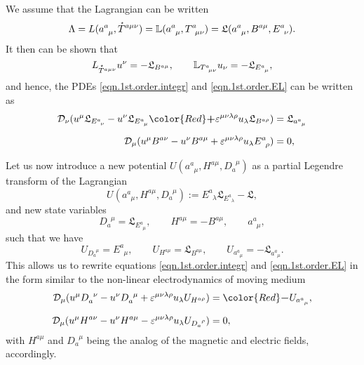 \documentclass[
10pt, %
a4paper, %
oneside, %
headinclude,footinclude, %
BCOR5mm, %
]{scrartcl}
\newcommand{\tetr}[2]{a^{#1}_{\phantom{#1}#2}}
\newcommand{\D}[1]{\mathcal{D}_{#1}} %
\newcommand{\Tors}[2]{T^{#1}_{\phantom{a}#2}}
\newcommand{\ET}[2]{E^{#1}_{\phantom{#1}#2}}	%
\newcommand{\eT}[2]{D_{#1}^{\phantom{#1}#2}}	%
\newcommand{\BT}[2]{B^{#1#2}}	%
\newcommand{\hT}[2]{H^{#1#2}}	%
\newcommand{\Laghodge}{L}%
\newcommand{\Lagtors}{\mathbb{L}}%
\newcommand{\LagBE}{\mathfrak{L}}%
\newcommand{\veps}{\varepsilon}
\newcommand{\HT}[1]{\accentset{\star}{T}^{#1}}
\begin{document}
We assume that the Lagrangian can be written 
\begin{equation}
\Lambda = \Laghodge(\tetr{a}{\mu},\HT{a\mu\nu}) = \Lagtors(\tetr{a}{\mu},\Tors{a}{\mu\nu}) = 
\LagBE(\tetr{a}{\mu},\BT{a}{\mu},\ET{a}{\nu}).
\end{equation}
It then can be shown that 
\begin{equation}
\Laghodge_{\HT{a\mu\nu}}u^\nu = -\LagBE_{\BT{a}{\mu}}, \qquad \Lagtors_{\Tors{a}{\mu\nu}}u_\nu = 
-\LagBE_{\ET{a}{\mu}},
\end{equation}
and hence, the PDEs \eqref{eqn.1st.order.integr} and \eqref{eqn.1st.order.EL} can be written as 
\begin{subequations}\label{eqn.tors.BE}
	\begin{align}
		\D{\nu}(u^\mu \LagBE_{\ET{a}{\nu}} - u^\nu\LagBE_{\ET{a}{\mu}} {\color{Red}\bm{+}} 
		\veps^{\mu\nu\lambda\rho}u_\lambda\LagBE_{\BT{a}{\rho}}) &=\LagBE_{\tetr{a}{\mu}}\\[2mm]
		\D{\mu}(u^\mu \BT{a}{\nu} - u^\nu\BT{a}{\mu} + 
		\veps^{\mu\nu\lambda\rho}u_\lambda\ET{a}{\rho}) &= 0,
	\end{align}
\end{subequations}

Let us now introduce a new potential $ U(\tetr{a}{\mu},\hT{a}{\mu},\eT{a}{\mu}) $ as a partial 
Legendre transform of the Lagrangian
\begin{equation}
 U(\tetr{a}{\mu},\hT{a}{\mu},\eT{a}{\mu}) := \ET{a}{\lambda}\LagBE_{\ET{a}{\lambda}} - \LagBE,
\end{equation}
and new state variables
\begin{equation}
\eT{a}{\mu} = \LagBE_{\ET{a}{\mu}}, \qquad \hT{a}{\mu} = -\BT{a}{\mu}, \qquad \tetr{a}{\mu},
\end{equation}
such that we have
\begin{equation}
U_{\eT{a}{\mu}} = \ET{a}{\mu}, \qquad U_{\hT{a}{\mu}} = \LagBE_{\BT{a}{\mu}},
\qquad U_{\tetr{a}{\mu}} = - \LagBE_{\tetr{a}{\mu}}.
\end{equation}
This allows us to rewrite equations \eqref{eqn.1st.order.integr} and \eqref{eqn.1st.order.EL} in 
the form similar to the non-linear 
electrodynamics of moving medium~\cite{Obukhov2008,DPRZ2017,Hohmann2018a}
\begin{subequations}
	\begin{align}
		\D{\mu}(u^\mu\eT{a}{\nu} - u^\nu\eT{a}{\mu} + \veps^{\mu\nu\lambda\rho}u_\lambda 
		U_{\hT{a}{\rho}})
		& ={\color{Red}\bm{-}}U_{\tetr{a}{\mu}},\\[2mm]
		\D{\mu}(u^\mu \hT{a}{\nu} - u^\nu\hT{a}{\mu} - 
		\veps^{\mu\nu\lambda\rho}u_\lambda 
		U_{\eT{a}{\rho}}) 
		& = 0,
\end{align}
\end{subequations}
with $\hT{a}{\mu}$ and $\eT{a}{\mu}$ being the analog of the magnetic and electric fields, 
accordingly.
\end{document}
